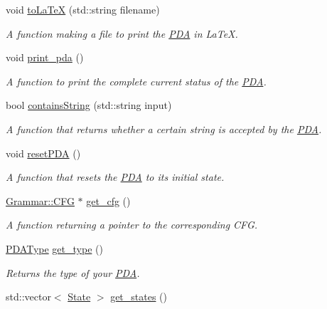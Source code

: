 \begin{DoxyCompactItemize}
void \hyperlink{classPDA_1_1PDA_a741e99b5d9e53e32d6808bf83dde96b2}{to\-La\-Te\-X} (std\-::string filename)
\begin{DoxyCompactList}\small\item\em \-A function making a file to print the \hyperlink{classPDA_1_1PDA}{\-P\-D\-A} in \-La\-Te\-X. \end{DoxyCompactList}\item 
void \hyperlink{classPDA_1_1PDA_a4a824e94ce14bf15a562e2b48a3792d7}{print\-\_\-pda} ()
\begin{DoxyCompactList}\small\item\em \-A function to print the complete current status of the \hyperlink{classPDA_1_1PDA}{\-P\-D\-A}. \end{DoxyCompactList}\item 
bool \hyperlink{classPDA_1_1PDA_a7f6cb548bcd3860306e3c96e0041ffd4}{contains\-String} (std\-::string input)
\begin{DoxyCompactList}\small\item\em \-A function that returns whether a certain string is accepted by the \hyperlink{classPDA_1_1PDA}{\-P\-D\-A}. \end{DoxyCompactList}\item 
void \hyperlink{classPDA_1_1PDA_ae4c877df604fd88c6725145cea4e86bd}{reset\-P\-D\-A} ()
\begin{DoxyCompactList}\small\item\em \-A function that resets the \hyperlink{classPDA_1_1PDA}{\-P\-D\-A} to its initial state. \end{DoxyCompactList}\item 
\hyperlink{classGrammar_1_1CFG}{\-Grammar\-::\-C\-F\-G} $\ast$ \hyperlink{classPDA_1_1PDA_ac9816a7ff5ec49d34a5ce7c491291cbd}{get\-\_\-cfg} ()
\begin{DoxyCompactList}\small\item\em \-A function returning a pointer to the corresponding \-C\-F\-G. \end{DoxyCompactList}\item 
\hyperlink{namespacePDA_a2f2b17cdf30facf6f0fe593ab209acf8}{\-P\-D\-A\-Type} \hyperlink{classPDA_1_1PDA_a7f42a6fc447655a3527e56fa56583a34}{get\-\_\-type} ()
\begin{DoxyCompactList}\small\item\em \-Returns the type of your \hyperlink{classPDA_1_1PDA}{\-P\-D\-A}. \end{DoxyCompactList}\item 
std\-::vector$<$ \hyperlink{classPDA_1_1State}{\-State} $>$ \hyperlink{classPDA_1_1PDA_aff69f2d9348174b9a42bc54b81fc57b4}{get\-\_\-states} ()

\end{DoxyCompactItemize}
